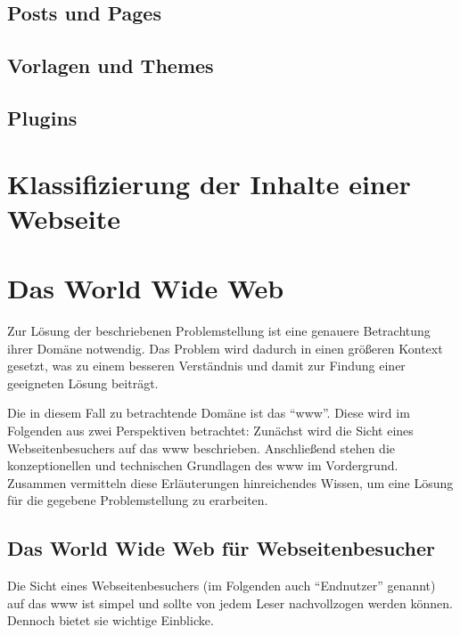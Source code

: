         \subsection{Posts und Pages}
        \subsection{Vorlagen und Themes}
        \subsection{Plugins}

    \section{Klassifizierung der Inhalte einer Webseite}

    
    \section{Das World Wide Web}
        \label{section:TheWWW}
        Zur Lösung der beschriebenen Problemstellung ist eine genauere
        Betrachtung ihrer Domäne notwendig.
        Das Problem wird dadurch in einen größeren Kontext gesetzt,
        was zu einem besseren Verständnis und damit zur Findung
        einer geeigneten Lösung beiträgt.

        Die in diesem Fall zu betrachtende Domäne ist das "`\gls{www}"'.
        Diese wird im Folgenden aus zwei Perspektiven betrachtet:
        Zunächst wird die Sicht eines Webseitenbesuchers auf das \gls{www} beschrieben.
        Anschließend stehen die konzeptionellen und technischen Grundlagen
        des \gls{www} im Vordergrund.
        Zusammen vermitteln diese Erläuterungen hinreichendes Wissen,
        um eine Lösung für die gegebene Problemstellung zu erarbeiten.

        \subsection{Das World Wide Web für Webseitenbesucher}
            \label{section:enduserViewOnWWW}
            Die Sicht eines Webseitenbesuchers (im Folgenden auch "`Endnutzer"' genannt)
            auf das \gls{www} ist simpel und sollte von jedem Leser nachvollzogen werden können.
            Dennoch bietet sie wichtige Einblicke.

